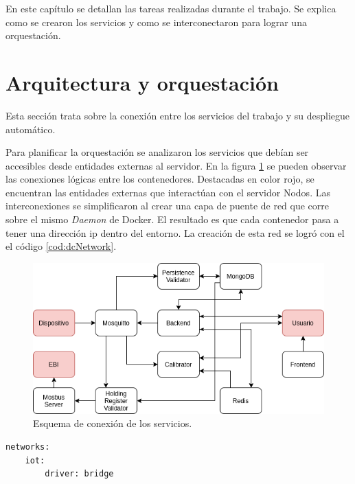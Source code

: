 En este capítulo se detallan las tareas realizadas durante el trabajo.
Se explica como se crearon los servicios y como se interconectaron para lograr una orquestación.
\section{Arquitectura y orquestación}
Esta sección trata sobre la conexión entre los servicios del trabajo y su despliegue automático.

Para planificar la orquestación se analizaron los servicios que debían ser accesibles desde entidades externas al servidor.
En la figura \ref{fig:ch3EsquemaTrabajo} se pueden observar las conexiones lógicas entre los contenedores.
Destacadas en color rojo, se encuentran las entidades externas que interactúan con el servidor Nodos.
Las interconexiones se simplificaron al crear una capa de puente de red que corre sobre el mismo \emph{Daemon} de Docker.
El resultado es que cada contenedor pasa a tener una dirección ip dentro del entorno.
La creación de esta red se logró con el el código \ref{cod:dcNetwork}.

\begin{figure}[h]
	\centering
	\includegraphics[width=\textwidth]{./Figures/ch3EsquemaTrabajo.png}
	\caption{Esquema de conexión de los servicios.}
	\label{fig:ch3EsquemaTrabajo}
\end{figure}

\begin{lstlisting}[label=cod:dcNetwork,caption=Red de interconexión Docker Compose.]
networks: 
	iot:
		driver: bridge
\end{lstlisting}

